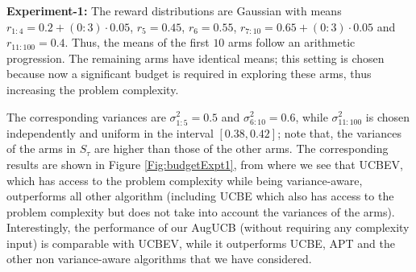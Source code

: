 \textbf{Experiment-1:} The reward distributions are Gaussian with  means  $r_{1:4}=0.2+(0:3)\cdot0.05$, $r_{5}=0.45$, $r_{6}=0.55$, $r_{7:10}=0.65+(0:3)\cdot0.05$ and $r_{11:100}=0.4$. Thus, the means of the first $10$ arms follow an arithmetic progression. The remaining arms have identical means; this setting is chosen because now a significant budget is required in exploring these arms, thus increasing the problem complexity.

 The corresponding variances are $\sigma_{1:5}^{2}=0.5$ and $\sigma_{6:10}^{2}=0.6$, while $\sigma_{11:100}^{2}$ is chosen independently and uniform in the  interval $[0.38,0.42]$; note that, the variances of the arms in $S_\tau$ are higher than those of the other arms. The corresponding  results are shown in Figure \ref{Fig:budgetExpt1}, from where we see that UCBEV, which has access to the problem complexity while being variance-aware, outperforms all other algorithm (including UCBE which also has access to the problem complexity but does not take into account the variances of the arms).  Interestingly, the performance of our AugUCB (without requiring any complexity input) is comparable with UCBEV, while it outperforms UCBE, APT and the other non variance-aware algorithms that we have considered. 	

